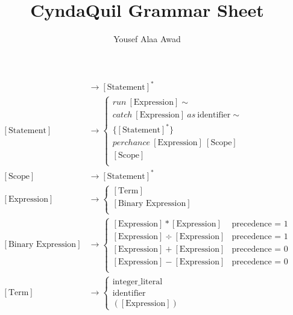 \documentclass[12pt, letterpaper]{article}
\title{CyndaQuil Grammar Sheet}
\author{Yousef Alaa Awad}
\begin{document}
\maketitle
\begin{align}
  [\text{Program}] &\to [\text{Statement}]^* \\
  [\text{Statement}] &\to \begin{cases}
    run\ [\text{Expression}]\sim \\
    catch\  [\text{Expression}]\ as\ \text{identifier}\sim \\
    \{[\text{Statement}]^*\} \\
    perchance\ [\text{Expression}]\ [\text{Scope}] \\
    [\text{Scope}] \\
  \end{cases} \\
  [\text{Scope}] &\to [\text{Statement}]^* \\
  [\text{Expression}]&\to \begin{cases}
    [\text{Term}] \\
    [\text{Binary Expression}] \\
  \end{cases} \\
  [\text{Binary Expression}] &\to \begin{cases}
    [\text{Expression}] * [\text{Expression}] & \text{precedence = 1}\\
    [\text{Expression}] \div [\text{Expression}] & \text{precedence = 1}\\
    [\text{Expression}] + [\text{Expression}] &  \text{precedence = 0}\\
    [\text{Expression}] - [\text{Expression}] &  \text{precedence = 0}\\
  \end{cases} \\
  [\text{Term}] &\to \begin{cases}
  \text{integer\_literal} \\
  \text{identifier} \\
    ([\text{Expression}])
  \end{cases}
\end{align}
\end{document}

